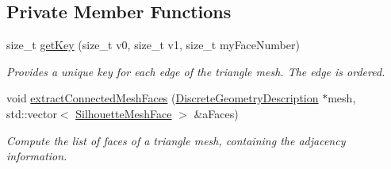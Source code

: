 \subsection*{Private Member Functions}
\begin{DoxyCompactItemize}
\item 
\mbox{\label{classvisilib_1_1_geometry_occluder_set_aadda8bb194352673b9fac4750655d786}} 
size\+\_\+t \mbox{\hyperlink{classvisilib_1_1_geometry_occluder_set_aadda8bb194352673b9fac4750655d786}{get\+Key}} (size\+\_\+t v0, size\+\_\+t v1, size\+\_\+t my\+Face\+Number)
\begin{DoxyCompactList}\small\item\em Provides a unique key for each edge of the triangle mesh. The edge is ordered. \end{DoxyCompactList}\item 
void \mbox{\hyperlink{classvisilib_1_1_geometry_occluder_set_a653a182d2a7f4ac669fe67693574b128}{extract\+Connected\+Mesh\+Faces}} (\mbox{\hyperlink{structvisilib_1_1_discrete_geometry_description}{Discrete\+Geometry\+Description}} $\ast$mesh, std\+::vector$<$ \mbox{\hyperlink{classvisilib_1_1_silhouette_mesh_face}{Silhouette\+Mesh\+Face}} $>$ \&a\+Faces)
\begin{DoxyCompactList}\small\item\em Compute the list of faces of a triangle mesh, containing the adjacency information. \end{DoxyCompactList}\end{DoxyCompactItemize}
